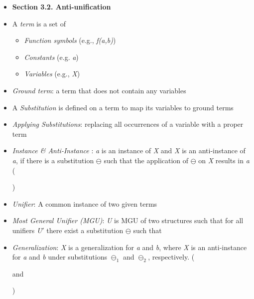 \documentclass{article}
\newcommand{\bold}{\textbf}
\newcommand{\itt}{\textit}
\newcommand{\vars}{\textit}
\begin{document}
\begin{itemize} [leftmargin=.1in]
\item \bold{Section 3.2. Anti-unification}
\item  A \itt{term} is a set of
\begin{itemize} [leftmargin=.1in]
\item \itt{Function symbols} (e.g., \vars{f(a,b)})
\item \itt{Constants} (e.g. \vars{a})
\item \itt{Variables} (e.g., \vars{X})
\end{itemize}
\item \itt{Ground term}: a term that does not contain any variables 
\item A \itt{Substitution} is defined on a term to map its variables to ground terms
\item \itt{Applying Substitutions}: replacing all occurrences of a variable with a proper term
\item \itt{Instance \& Anti-Instance }:  \vars{a} is an instance of \vars{X} and \vars{X} is an anti-instance of \vars{a}, if there is a substitution $\ominus$ such that the application of $\ominus$ on \vars{X} results in \vars{a} ()
\item \itt{Unifier}: A common instance of two given terms
\item \itt{Most General Unifier (MGU)}: \vars{U} is MGU of two structures such that for all unifiers \vars{U}${\prime}$ there exist a substitution $\ominus$ such that 

\item \itt{Generalization}: \vars{X} is a generalization for \vars{a} and \vars{b}, where \vars{X} is an anti-instance for  \vars{a} and \vars{b} under substitutions $\ominus_1$ and $\ominus_2$, respectively. ( and)


\end{itemize}
\end{document}

